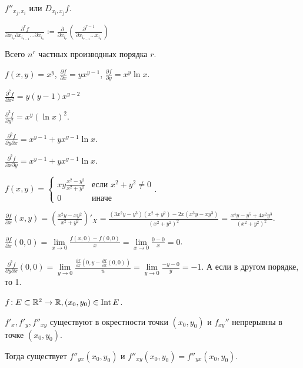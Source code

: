 \begin{definition}[Обозначения]
    $f''_{x_j, x_i}$ или  $D_{x_i, x_j}f$.    

    $\frac{\partial^r f}{\partial x_{i_r} \partial x_{i_{r-1}} \ldots \partial x_{i_1}} \coloneqq \frac{\partial}{\partial x_{i_r}} \left( \frac{\partial^{r-1}}{\partial x_{i_{r-1}} \ldots x_{i_1}}\right)$
\end{definition}
\begin{remark}
    Всего $n^r$ частных производных порядка $r$.
\end{remark}
\begin{example}
    $f(x, y) = x^y$,  $\frac{\partial f}{\partial x} = y x^{y-1}$, $\frac{\partial f}{\partial y} = x^y \ln x$.

    $\frac{\partial^2 f}{\partial x^2} = y(y-1)x^{y-2}$

    $\frac{\partial^2 f}{\partial y^2} = x^y (\ln x)^2$.

    $\frac{\partial^2 f}{\partial y \partial x} = x^{y-1} + y x^{y-1} \ln x$.

    $\frac{\partial^2 f}{\partial x \partial y} = x^{y-1} + y x^{y-1} \ln x$.
\end{example}
\begin{example}
    $f(x, y) = \begin{cases} xy \frac{x^2 - y^2}{x^2 + y^2} & \text{если } x^2 + y^2 \neq 0\\ 0 & \text{иначе} \end{cases}$.

    $\frac{\partial f}{\partial x}(x, y) = \left( \frac{x^2y - xy^2}{x^2+y^2}\right)'_X = \frac{(3x^2y-y^3)(x^2+y^2) - 2x(x^3y-xy^3)}{(x^2+y^2)^2} = \frac{x^4y-y^5+4x^2y^3}{(x^2+y^2)^2}$.

    $\frac{\partial f}{\partial x}(0, 0) = \lim\limits_{x \to 0} \frac{f(x, 0) - f(0, 0)}{x} = \lim\limits_{x \to 0} \frac{0 - 0}{x} = 0$.

    $\frac{\partial^2 f}{\partial y \partial x}(0, 0) = \lim\limits_{y \to 0} \frac{\frac{\partial f}{\partial x}(0, y - \frac{\partial f}{\partial x}(0, 0))}{u} = \lim\limits_{y \to 0}\frac{-y - 0}{y} = -1$. А если в другом порядке, то 1.
\end{example}
\begin{theorem}
    $f\!: E \subset \mathbb{R}^2 \to \mathbb{R}, (x_0, y_0) \in \operatorname{Int} E$.

    $f'_x, f'_y, f''_{xy}$ существуют в окрестности  точки  $(x_0, y_0)$ и $f_{xy}''$ непрерывны в точке  $(x_0, y_0)$.

    Тогда существует $f''_{yx}(x_0, y_0)$ и $f''_{xy}(x_0, y_0) = f''_{yx}(x_0, y_0)$.
\end{theorem}
